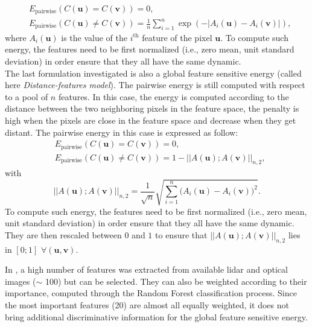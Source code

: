 \begin{equation}
\begin{aligned}
& E_{\text{pairwise}}(C(\mathbf{u}) = C(\mathbf{v}))=0, \\
& E_{\text{pairwise}}(C(\mathbf{u}) \neq C(\mathbf{v}))=\frac{1}{n}\sum_{i=1}^{n}\exp({-|A_{i}(\mathbf{u})-A_{i}(\mathbf{v})|}),
\end{aligned}
\label{eq:prior3}
\end{equation}
where $A_{i}(\mathbf{u})$ is the value of the $i^{\text{th}}$ feature of the pixel $\mathbf{u}$. To compute such energy, the features need to be first normalized (i.e., zero mean, unit standard deviation) in order ensure that they all have the same dynamic.\\
The last formulation investigated is also a global feature sensitive energy (called here \textit{Distance-features model}). The pairwise energy is still computed with respect to a pool of $n$ features. In this case, the energy is computed according to the distance between the two neighboring pixels in the feature space, the penalty is high when the pixels are close in the feature space and decrease when they get distant. The pairwise energy in this case is expressed as follow:
\begin{equation}
\begin{aligned}
& E_{\text{pairwise}}(C(\mathbf{u}) = C(\mathbf{v}))=0, \\
& E_{\text{pairwise}}(C(\mathbf{u}) \neq C(\mathbf{v}))=1-||A(\mathbf{u});A(\mathbf{v})||_{n,2},
\end{aligned}
\label{eq:prior4}
\end{equation}
with
\begin{equation}
||A(\mathbf{u});A(\mathbf{v})||_{n,2}=\frac{1}{\sqrt{n}}\sqrt{\sum_{i=1}^{n}\big(A_{i}(\mathbf{u})-A_{i}(\mathbf{v})\big)^{2}}.
\end{equation}
To compute such energy, the features need to be first normalized (i.e., zero mean, unit standard deviation) in order ensure that they all have the same dynamic. They are then rescaled between $0$ and $1$ to ensure that $||A(\mathbf{u});A(\mathbf{v})||_{n,2}$ lies in $[0;1]$ $\forall (\mathbf{u},\mathbf{v})$.

In \cite{clement_IJPRS}, a high number of features was extracted from available lidar and optical images ($\sim$ 100) but can be selected. They can also be weighted according to their importance, computed through the Random Forest classification process. Since the most important features (20) are almost all equally weighted, it does not bring additional discriminative information for the global feature sensitive energy.


